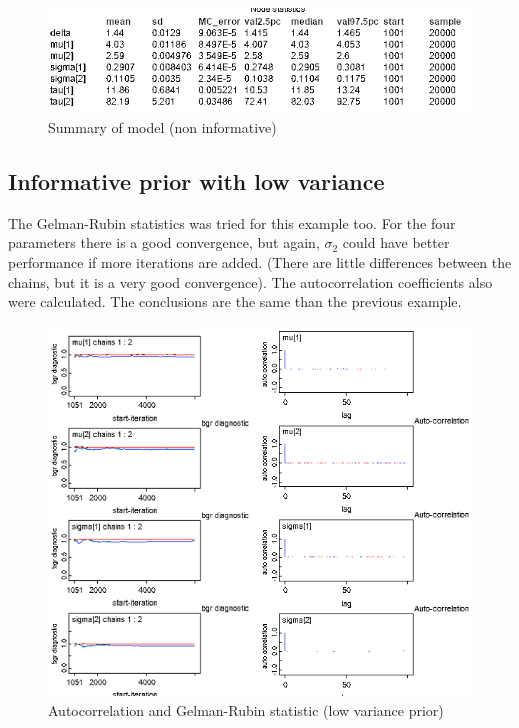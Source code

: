 \documentclass{article}
\begin{document}
\begin{figure}[ht!]
  \centering
  \includegraphics[width=.8\textwidth]{imgs/NonInf_table.png}
  \caption{Summary of model (non informative)}
  \label{fig:fig7}
\end{figure}

\pagebreak

\subsection{Informative prior with low variance}
The Gelman-Rubin statistics was tried for this example too. For the four parameters there is a good convergence, but again, $\sigma_2$ could have better performance if more iterations are added. (There are little differences between the chains, but it is a very good convergence). The autocorrelation coefficients also were calculated. The conclusions are the same than the previous example.
\begin{figure}[ht!]
  \centering
  \includegraphics[width=1\textwidth]{imgs/Inf_low.png}
  \caption{Autocorrelation and Gelman-Rubin statistic (low variance prior)}
  \label{fig:fig8}
\end{figure}
\end{document}
